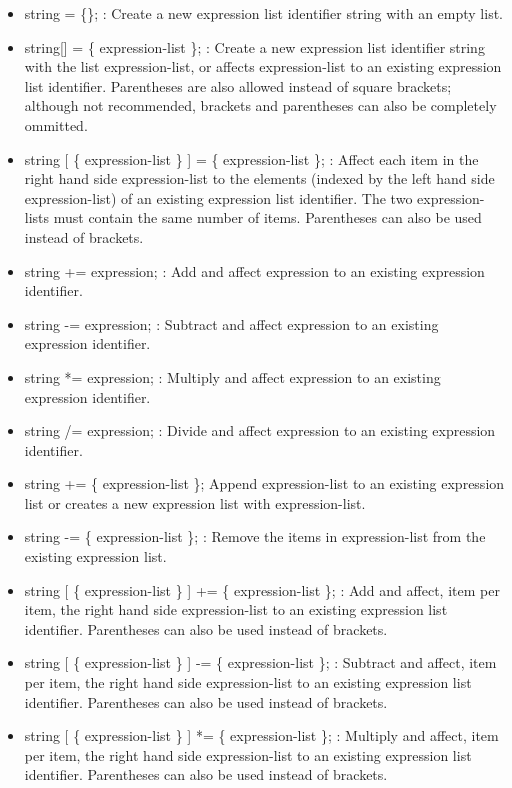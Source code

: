 \documentclass[dvipdfmx, 9pt, a4paper]{article}
\numberwithin{equation}{section}
\begin{document}
\begin{itemize}
\begin{itemize}
\end{itemize}
\item string = \{\}; : Create a new expression list identifier string with an empty list.
\item string[] = \{ expression-list \}; : Create a new expression list identifier string with the list expression-list, or affects expression-list to an existing expression list identifier. Parentheses are also allowed instead of square brackets; although not recommended, brackets and parentheses can also be completely ommitted.
\item string [ \{ expression-list \} ] = \{ expression-list \}; : Affect each item in the right hand side expression-list to the elements (indexed by the left hand side expression-list) of an existing expression list identifier. The two expression-lists must contain the same number of items. Parentheses can also be used instead of brackets.
\item string += expression; : Add and affect expression to an existing expression identifier.
\item string -= expression; : Subtract and affect expression to an existing expression identifier.
\item string *= expression; : Multiply and affect expression to an existing expression identifier.
\item string /= expression; : Divide and affect expression to an existing expression identifier.
\item string += \{ expression-list \}; Append expression-list to an existing expression list or creates a new expression list with expression-list.
\item string -= \{ expression-list \}; : Remove the items in expression-list from the existing expression list.
\item string [ \{ expression-list \} ] += \{ expression-list \}; : Add and affect, item per item, the right hand side expression-list to an existing expression list identifier. Parentheses can also be used instead of brackets.
\item string [ \{ expression-list \} ] -= \{ expression-list \}; : Subtract and affect, item per item, the right hand side expression-list to an existing expression list identifier. Parentheses can also be used instead of brackets.
\item string [ \{ expression-list \} ] *= \{ expression-list \}; : Multiply and affect, item per item, the right hand side expression-list to an existing expression list identifier. Parentheses can also be used instead of brackets.

\end{itemize}
\end{document}

